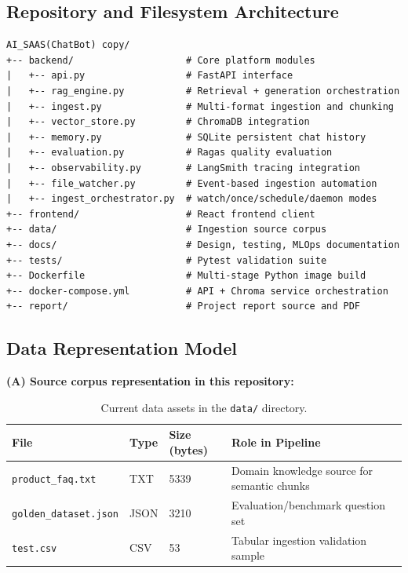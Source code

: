 \documentclass[12pt,letterpaper]{report}
\begin{document}
\subsection{Repository and Filesystem Architecture}
\begin{verbatim}
AI_SAAS(ChatBot) copy/
+-- backend/                    # Core platform modules
|   +-- api.py                  # FastAPI interface
|   +-- rag_engine.py           # Retrieval + generation orchestration
|   +-- ingest.py               # Multi-format ingestion and chunking
|   +-- vector_store.py         # ChromaDB integration
|   +-- memory.py               # SQLite persistent chat history
|   +-- evaluation.py           # Ragas quality evaluation
|   +-- observability.py        # LangSmith tracing integration
|   +-- file_watcher.py         # Event-based ingestion automation
|   +-- ingest_orchestrator.py  # watch/once/schedule/daemon modes
+-- frontend/                   # React frontend client
+-- data/                       # Ingestion source corpus
+-- docs/                       # Design, testing, MLOps documentation
+-- tests/                      # Pytest validation suite
+-- Dockerfile                  # Multi-stage Python image build
+-- docker-compose.yml          # API + Chroma service orchestration
+-- report/                     # Project report source and PDF
\end{verbatim}

\subsection{Data Representation Model}
\textbf{(A) Source corpus representation in this repository:}
\begin{table}[h]
\centering
\begin{tabular}{p{}p{}p{}p{}}
\hline
\textbf{File} & \textbf{Type} & \textbf{Size (bytes)} & \textbf{Role in Pipeline} \\
\hline
\texttt{product\_faq.txt} & TXT & 5339 & Domain knowledge source for semantic chunks \\
\texttt{golden\_dataset.json} & JSON & 3210 & Evaluation/benchmark question set \\
\texttt{test.csv} & CSV & 53 & Tabular ingestion validation sample \\
\hline
\end{tabular}
\caption{Current data assets in the \texttt{data/} directory.}
\end{table}
\end{document}
